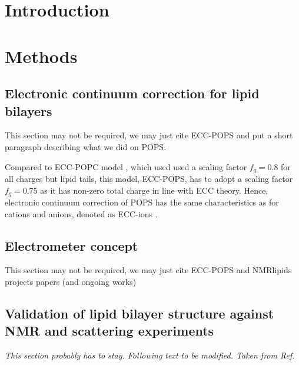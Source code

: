 \documentclass[journal=jpcbfk,manuscript=article]{achemso}
\begin{document}
 
 
 
 
\section{Introduction} 
 
\section{Methods} 
 
\subsection{Electronic continuum correction for lipid bilayers}\label{section:ecc} 
This section may not be required, we may just cite ECC-POPS 
and put a short paragraph describing what we did on POPS. 

Compared to ECC-POPC model \cite{melcr18}, 
which used used a scaling factor $f_q = 0.8$ for all charges but lipid tails,
this model, ECC-POPS, has to adopt a scaling factor $f_q = 0.75$ 
as it has non-zero total charge in line with ECC theory. \cite{leontyev09}
Hence, electronic continuum correction of POPS 
has the same characteristics as for cations and anions, 
denoted as ECC-ions \cite{martinek17, Pluharova2014, kohagen14, kohagen16}. 
 
 
 
\subsection{Electrometer concept} \label{section:electrometer} 
This section may not be required, 
we may just cite ECC-POPS and NMRlipids projects papers (and ongoing works)
 
 
 
\subsection{Validation of lipid bilayer structure against NMR and scattering experiments} 
\emph{This section probably has to stay. Following text to be modified. Taken from Ref.~}
\end{document}
